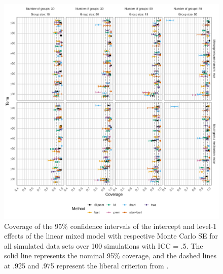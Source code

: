 \documentclass[10pt, a4paper, titlepage]{article}
\begin{document}
\begin{figure}[H]
    \centering
    \includegraphics[width=1\textwidth]{coveragelevel1.png}
    \caption{Coverage of the 95\% confidence intervals of the intercept and level-1 effects of the linear mixed model with respective Monte Carlo SE for all simulated data sets over 100 simulations with ICC = .5. The solid line represents the nominal 95\% coverage, and the dashed lines at .925 and .975 represent the liberal criterion from \citet{bradley1978}.}
    \label{fig:coveragelevel1}
\end{figure}
\end{document}
